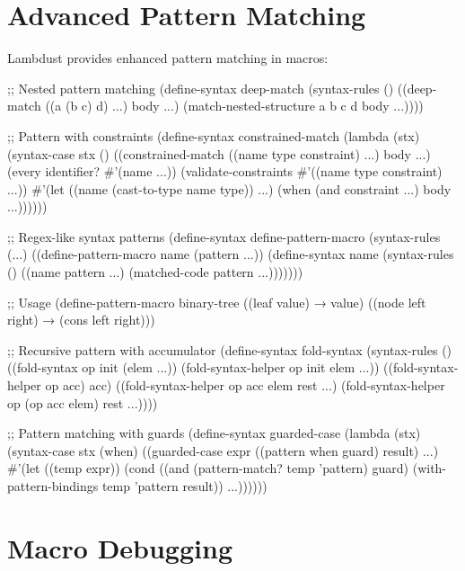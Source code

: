 \section{Advanced Pattern Matching}
\label{sec:advanced-patterns}


Lambdust provides enhanced pattern matching in macros:

\begin{example}
\begin{lambdustcode}
;; Nested pattern matching
(define-syntax deep-match
  (syntax-rules ()
    ((deep-match ((a (b c) d) ...) body ...)
     (match-nested-structure a b c d body ...))))

;; Pattern with constraints
(define-syntax constrained-match
  (lambda (stx)
    (syntax-case stx ()
      ((constrained-match ((name type constraint) ...) body ...)
       (every identifier? #'(name ...))
       (validate-constraints #'((name type constraint) ...))
       #'(let ((name (cast-to-type name type)) ...)
           (when (and constraint ...)
             body ...))))))

;; Regex-like syntax patterns
(define-syntax define-pattern-macro
  (syntax-rules (...)
    ((define-pattern-macro name (pattern ...))
     (define-syntax name
       (syntax-rules ()
         ((name pattern ...) (matched-code pattern ...)))))))

;; Usage
(define-pattern-macro binary-tree
  ((leaf value) → value)
  ((node left right) → (cons left right)))

;; Recursive pattern with accumulator
(define-syntax fold-syntax
  (syntax-rules ()
    ((fold-syntax op init (elem ...))
     (fold-syntax-helper op init elem ...))
    ((fold-syntax-helper op acc)
     acc)
    ((fold-syntax-helper op acc elem rest ...)
     (fold-syntax-helper op (op acc elem) rest ...))))

;; Pattern matching with guards
(define-syntax guarded-case
  (lambda (stx)
    (syntax-case stx (when)
      ((guarded-case expr 
         ((pattern when guard) result) ...)
       #'(let ((temp expr))
           (cond
             ((and (pattern-match? temp 'pattern) guard) 
              (with-pattern-bindings temp 'pattern result)) ...))))))
\end{lambdustcode}
\end{example}

\section{Macro Debugging}
\label{sec:macro-debugging}

